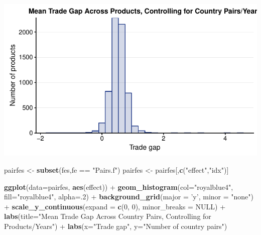 \documentclass[10pt,]{article}
\newenvironment{Shaded}{\begin{snugshade}}{\end{snugshade}}
\newcommand{\KeywordTok}[1]{\textcolor[rgb]{0.13,0.29,0.53}{\textbf{{#1}}}}
\newcommand{\DataTypeTok}[1]{\textcolor[rgb]{0.13,0.29,0.53}{{#1}}}
\newcommand{\DecValTok}[1]{\textcolor[rgb]{0.00,0.00,0.81}{{#1}}}
\newcommand{\StringTok}[1]{\textcolor[rgb]{0.31,0.60,0.02}{{#1}}}
\newcommand{\OtherTok}[1]{\textcolor[rgb]{0.56,0.35,0.01}{{#1}}}
\newcommand{\NormalTok}[1]{{#1}}
\begin{document}
\begin{center}\includegraphics{Figs/value_years_reg-2} \end{center}

\begin{Shaded}
\begin{Highlighting}[]
\NormalTok{pairfes <-}\StringTok{ }\KeywordTok{subset}\NormalTok{(fes,fe ==}\StringTok{ "Pairs.f"}\NormalTok{)}
\NormalTok{pairfes <-}\StringTok{ }\NormalTok{pairfes[,}\KeywordTok{c}\NormalTok{(}\StringTok{"effect"}\NormalTok{,}\StringTok{"idx"}\NormalTok{)]}

\KeywordTok{ggplot}\NormalTok{(}\DataTypeTok{data=}\NormalTok{pairfes, }\KeywordTok{aes}\NormalTok{(effect)) +}
\StringTok{  }\KeywordTok{geom_histogram}\NormalTok{(}\DataTypeTok{col=}\StringTok{"royalblue4"}\NormalTok{,}
                 \DataTypeTok{fill=}\StringTok{"royalblue4"}\NormalTok{,}
                 \DataTypeTok{alpha=}\NormalTok{.}\DecValTok{2}\NormalTok{) +}
\StringTok{  }\KeywordTok{background_grid}\NormalTok{(}\DataTypeTok{major =} \StringTok{'y'}\NormalTok{, }\DataTypeTok{minor =} \StringTok{"none"}\NormalTok{) +}
\StringTok{  }\KeywordTok{scale_y_continuous}\NormalTok{(}\DataTypeTok{expand =} \KeywordTok{c}\NormalTok{(}\DecValTok{0}\NormalTok{, }\DecValTok{0}\NormalTok{), }\DataTypeTok{minor_breaks =} \OtherTok{NULL}\NormalTok{) +}
\StringTok{  }\KeywordTok{labs}\NormalTok{(}\DataTypeTok{title=}\StringTok{"Mean Trade Gap Across Country Pairs, Controlling for Products/Years"}\NormalTok{) +}
\StringTok{  }\KeywordTok{labs}\NormalTok{(}\DataTypeTok{x=}\StringTok{"Trade gap"}\NormalTok{, }\DataTypeTok{y=}\StringTok{"Number of country pairs"}\NormalTok{)}
\end{Highlighting}
\end{Shaded}
\end{document}
